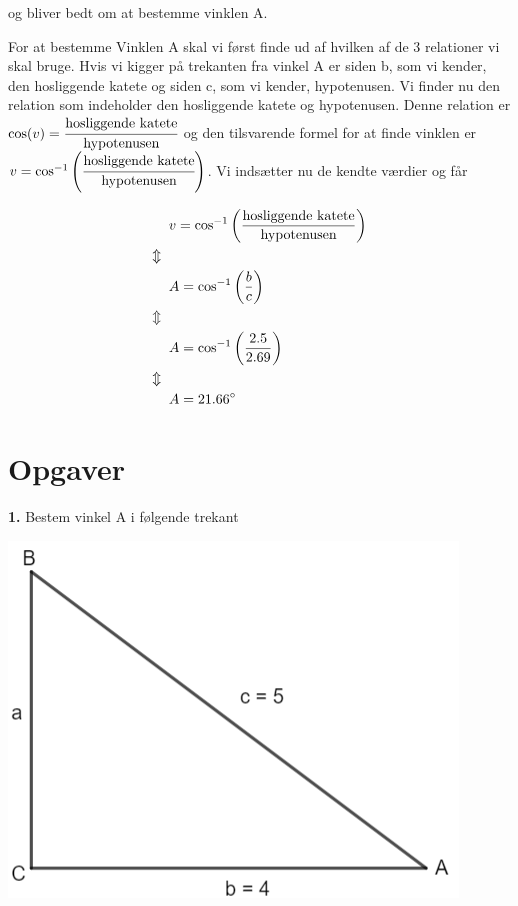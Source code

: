 og bliver bedt om at bestemme vinklen A.

For at bestemme Vinklen A skal vi først finde ud af hvilken af de 3 relationer vi skal bruge. Hvis vi kigger på trekanten fra vinkel A er siden b, som vi kender, den hosliggende katete og siden c, som vi kender, hypotenusen. Vi finder nu den relation som indeholder den hosliggende katete og hypotenusen. Denne relation er $\cos(v) = \cfrac{\text{hosliggende katete}}{\text{hypotenusen}}$ og den tilsvarende formel for at finde vinklen er $v = \cos^{-1}\left(\cfrac{\text{hosliggende katete}}{\text{hypotenusen}}\right) $. Vi indsætter nu de kendte værdier og får

\begin{align*}
&v = \cos^{-1}\left(\frac{\text{hosliggende katete}}{\text{hypotenusen}}\right)\\
\Updownarrow \hspace*{2mm} &\\
&A = \cos^{-1}\left(\frac{b}{c}\right)\\
\Updownarrow \hspace*{2mm} &\\
&A = \cos^{-1}\left(\frac{2.5}{2.69}\right)\\
\Updownarrow \hspace*{2mm} &\\
&A = 21.66^{\circ}
\end{align*}

\section*{Opgaver}

\textbf{1.}
Bestem vinkel A i følgende trekant

\includegraphics[scale=0.7]{img_3}

